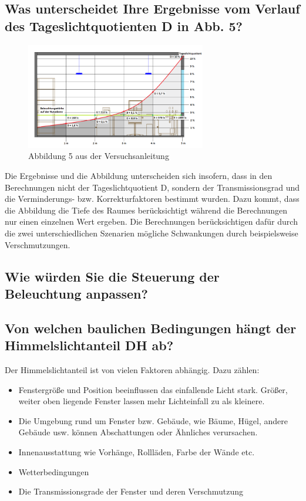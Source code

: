 \subsection{Was unterscheidet Ihre Ergebnisse vom Verlauf des Tageslichtquotienten D in Abb. 5?}


\begin{figure}[!h]
    \centering
    \includegraphics[width=0.7\textwidth]{Abbildungen/abb5.png}
    \caption{Abbildung 5 aus der Versuchsanleitung }
    \label{fig:abb5}
\end{figure}

Die Ergebnisse und die Abbildung unterscheiden sich insofern, dass in den Berechnungen nicht der Tageslichtquotient D, sondern der Transmissionsgrad und die Verminderungs- bzw. Korrekturfaktoren bestimmt wurden.
Dazu kommt, dass die Abbildung die Tiefe des Raumes berücksichtigt während die Berechnungen nur einen einzelnen Wert ergeben. 
Die Berechnungen berücksichtigen dafür durch die zwei unterschiedlichen Szenarien mögliche Schwankungen durch beispielsweise Verschmutzungen.

\subsection{Wie würden Sie die Steuerung der Beleuchtung anpassen?}



\subsection{Von welchen baulichen Bedingungen hängt der Himmelslichtanteil DH ab?}

Der Himmelslichtanteil ist von vielen Faktoren abhängig. Dazu zählen:
\begin{itemize}
\item Fenstergröße und Position beeinflussen das einfallende Licht stark. Größer, weiter oben liegende Fenster lassen mehr Lichteinfall zu als kleinere. 
\item Die Umgebung rund um Fenster bzw. Gebäude, wie Bäume, Hügel, andere Gebäude usw. können Abschattungen oder Ähnliches verursachen.
\item Innenausstattung wie Vorhänge, Rollläden, Farbe der Wände etc. 
\item Wetterbedingungen
\item Die Transmissionsgrade der Fenster und deren Verschmutzung

\end{itemize}

